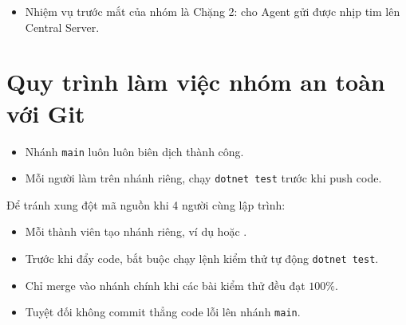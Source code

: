 \documentclass[12pt,a4paper]{article}
\begin{document}
\begin{takeawaybox}
\begin{itemize}[leftmargin=1.5em, itemsep=1pt]
  \item Nhiệm vụ trước mắt của nhóm là Chặng 2: cho Agent gửi được nhịp tim lên Central Server.
\end{itemize}
\end{takeawaybox}

\section{Quy trình làm việc nhóm an toàn với Git}

\begin{summarybox}
\begin{itemize}[leftmargin=1.5em, itemsep=1pt]
  \item Nhánh \texttt{main} luôn luôn biên dịch thành công.
  \item Mỗi người làm trên nhánh riêng, chạy \texttt{dotnet test} trước khi push code.
\end{itemize}
\end{summarybox}

Để tránh xung đột mã nguồn khi 4 người cùng lập trình:
\begin{itemize}
  \item Mỗi thành viên tạo nhánh riêng, ví dụ  hoặc .
  \item Trước khi đẩy code, bắt buộc chạy lệnh kiểm thử tự động \texttt{dotnet test}.
  \item Chỉ merge vào nhánh chính khi các bài kiểm thử đều đạt $100\%$.
\end{itemize}

\begin{takeawaybox}
\begin{itemize}[leftmargin=1.5em, itemsep=1pt]
  \item Tuyệt đối không commit thẳng code lỗi lên nhánh \texttt{main}.
\end{itemize}
\end{takeawaybox}

\end{document}
